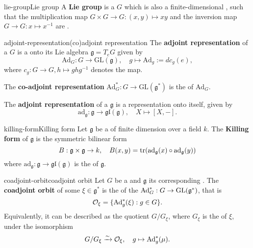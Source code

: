 \begin{topic}{lie-group}{Lie group}
    A \textbf{Lie group} is a  $G$ which is also a finite-dimensional , such that the multiplication map $G \times G \to G : (x, y) \mapsto xy$ and the inversion map $G \to G : x \mapsto x^{-1}$ are .
\end{topic}

\begin{topic}{adjoint-representation}{(co)adjoint representation}
    The \textbf{adjoint representation} of a  $G$ is a  onto its Lie algebra $\mathfrak{g} = T_e G$ given by
    \[ \text{Ad}_G : G \to \text{GL}(\mathfrak{g}), \quad g \mapsto \text{Ad}_g := d c_g(e) , \]
    where $c_g : G \to G, h \mapsto g h g^{-1}$ denotes the  map.
    
    The \textbf{co-adjoint representation} $\text{Ad}_G^* : G \to \text{GL}(\mathfrak{g}^*)$ is the  of $\text{Ad}_G$.
    
    The \textbf{adjoint representation} of a  $\mathfrak{g}$ is a representation onto itself, given by
    \[ \text{ad}_{\mathfrak{g}}: \mathfrak{g} \to \mathfrak{gl}(\mathfrak{g}), \quad X \mapsto [X, -] . \]
\end{topic}

\begin{topic}{killing-form}{Killing form}
    Let $\mathfrak{g}$ be a  of finite dimension over a field $k$. The \textbf{Killing form} of $\mathfrak{g}$ is the symmetric bilinear form
    \[ B : \mathfrak{g} \times \mathfrak{g} \to k, \quad B(x, y) = \textup{tr}(\textup{ad}_{\mathfrak{g}}(x) \circ \textup{ad}_{\mathfrak{g}}(y)) \]
    where $\text{ad}_\mathfrak{g} : \mathfrak{g} \to \mathfrak{gl}(\mathfrak{g})$ is the  of $\mathfrak{g}$.
\end{topic}

\begin{topic}{coadjoint-orbit}{coadjoint orbit}
    Let $G$ be a  and $\mathfrak{g}$ its corresponding . The \textbf{coadjoint orbit} of some $\xi \in \mathfrak{g}^*$ is the  of the  $\textup{Ad}^*_G : G \to \textup{GL}(\mathfrak{g}^*)$, that is
    \[ \mathcal{O}_\xi = \{ \textup{Ad}_g^*(\xi) : g \in G \} . \]
    Equivalently, it can be described as the quotient $G/G_\xi$, where $G_\xi$ is the  of $\xi$, under the isomorphism
    \[ G/G_\xi \xrightarrow{\sim} \mathcal{O}_\xi, \quad g \mapsto \textup{Ad}_g^*(\mu) . \]
\end{topic}

